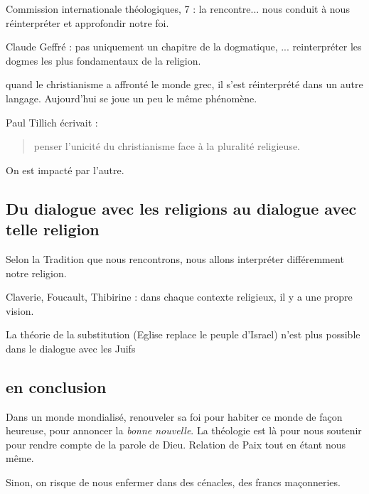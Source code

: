 Commission internationale théologiques, 7 : la rencontre... nous conduit à nous réinterpréter et approfondir notre foi.

Claude Geffré : pas uniquement un chapitre de la dogmatique, ... reinterpréter les dogmes les plus fondamentaux de la religion.

\begin{Ex}
quand le christianisme a affronté le monde grec, il s'est réinterprété dans un autre langage. Aujourd'hui se joue un peu le même phénomène. 
\end{Ex}

Paul Tillich  écrivait : 
\begin{quote}
    penser l'unicité du christianisme face à la pluralité religieuse.
\end{quote}
On est impacté par l'autre.



\subsection{Du dialogue avec les religions au dialogue avec telle religion}
 
 
Selon la Tradition que nous rencontrons, nous allons interpréter différemment notre religion. 
\begin{Ex}
Claverie, Foucault, Thibirine : dans chaque contexte religieux, il y a une propre vision.
\end{Ex}
\begin{Ex}
La théorie de la substitution (Eglise replace le peuple d'Israel) n'est plus possible dans le dialogue avec les Juifs
\end{Ex}

\subsection{en conclusion}
\begin{Synthesis}
Dans un monde mondialisé, renouveler sa foi pour habiter ce monde de façon heureuse, pour annoncer la \textit{bonne nouvelle}.
La théologie est là pour nous soutenir pour rendre compte de la parole de Dieu. Relation de Paix tout en étant nous même.
\end{Synthesis}
Sinon, on risque de nous enfermer dans des cénacles, des francs maçonneries.
